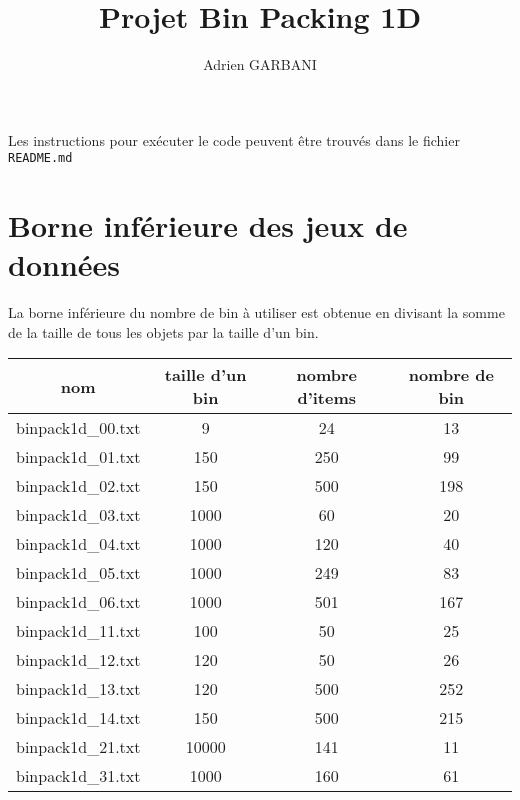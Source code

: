 \documentclass[10pt,a4paper]{article}
\author{Adrien GARBANI}
\title{Projet Bin Packing 1D}
\begin{document}
\maketitle

Les instructions pour exécuter le code peuvent être trouvés dans le fichier \texttt{README.md}

\section{Borne inférieure des jeux de données}

La borne inférieure du nombre de bin à utiliser est obtenue en divisant la somme de la taille de tous les objets par la taille d'un bin.

\begin{center}
  \begin{tabular}{ | c | c | c | c | }  \hline
    nom               & taille d'un bin & nombre d'items & nombre de bin \\ \hline
    binpack1d\_00.txt & 9               & 24             & 13            \\ \hline
    binpack1d\_01.txt & 150             & 250            & 99            \\ \hline
    binpack1d\_02.txt & 150             & 500            & 198           \\ \hline
    binpack1d\_03.txt & 1000            & 60             & 20            \\ \hline
    binpack1d\_04.txt & 1000            & 120            & 40            \\ \hline
    binpack1d\_05.txt & 1000            & 249            & 83            \\ \hline
    binpack1d\_06.txt & 1000            & 501            & 167           \\ \hline
    binpack1d\_11.txt & 100             & 50             & 25            \\ \hline
    binpack1d\_12.txt & 120             & 50             & 26            \\ \hline
    binpack1d\_13.txt & 120             & 500            & 252           \\ \hline
    binpack1d\_14.txt & 150             & 500            & 215           \\ \hline
    binpack1d\_21.txt & 10000           & 141            & 11            \\ \hline
    binpack1d\_31.txt & 1000            & 160            & 61            \\ \hline
  \end{tabular}
\end{center}
\end{document}

